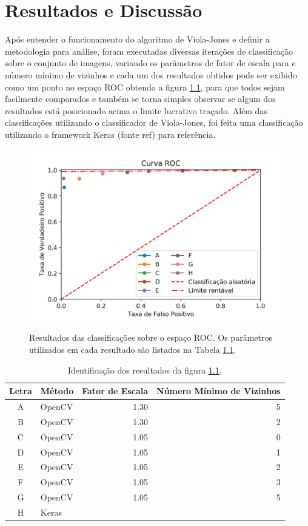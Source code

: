 \chapter{Resultados e Discussão}\label{cap:resultados}

Após entender o funcionamento do algoritmo de Viola-Jones e definir a metodologia para análise, foram executadas diversas iterações de classificação sobre o conjunto de imagens, variando os parâmetros de fator de escala para e número mínimo de vizinhos e cada um dos resultados obtidos pode ser exibido como um ponto no espaço ROC obtendo a figura \ref{fig:results_roc}, para que todos sejam facilmente comparados e também se torna simples observar se algum dos resultados está posicionado acima o limite lucrativo traçado. Além das classificações utilizando o classificador de Viola-Jones, foi feita uma classificação utilizando o framework Keras (fonte ref{}) para referência. 

\begin{figure}[htbp]
     \centering
     \caption{Resultados das classificações sobre o espaço ROC. Os parâmetros utilizados em cada resultado são listados na Tabela \ref{tab:results_identify}.}
     \includegraphics[scale=1]{figs/curva_roc_results.png}
     \label{fig:results_roc}
 \end{figure}

 \begin{table}[htbp]
     \caption{Identificação dos resultados da figura \ref{fig:results_roc}.}
     \label{tab:results_identify}
     \centering
     \begin{tabular}{clrr}
      Letra & Método & Fator de Escala & Número Mínimo de Vizinhos \\
      \midrule
           A & OpenCV & 1.30 & 5 \\
           B & OpenCV & 1.30 & 2 \\
           C & OpenCV & 1.05 & 0 \\
           D & OpenCV & 1.05 & 1 \\
           E & OpenCV & 1.05 & 2 \\
           F & OpenCV & 1.05 & 3 \\
           G & OpenCV & 1.05 & 5 \\
           H & Keras & & \\
      \end{tabular}
 \end{table}

